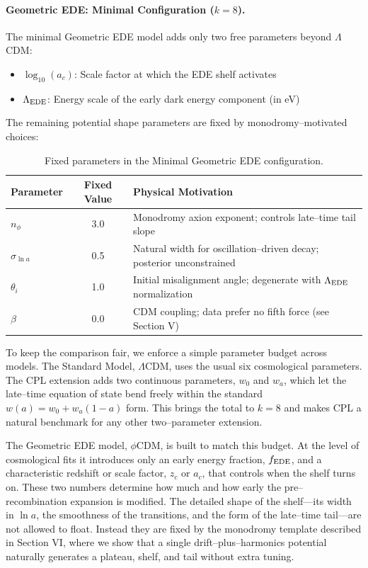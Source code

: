 \documentclass[a4paper,11pt]{article}
\begin{document}
\paragraph{Geometric EDE: Minimal Configuration ($k = 8$).}
The minimal Geometric EDE model adds only two free parameters beyond $\Lambda$CDM:
\begin{itemize}
    \item $\log_{10}(a_c)$: Scale factor at which the EDE shelf activates
    \item $\Lambda_{\rm EDE}$: Energy scale of the early dark energy component (in eV)
\end{itemize}

The remaining potential shape parameters are fixed by monodromy--motivated choices:

\begin{table}[h]
\centering
\caption{Fixed parameters in the Minimal Geometric EDE configuration.}
\label{tab:fixed_params}
\begin{tabular}{lcl}
\toprule
Parameter & Fixed Value & Physical Motivation \\
\midrule
$n_\phi$ & 3.0 & Monodromy axion exponent; controls late--time tail slope \\
$\sigma_{\ln a}$ & 0.5 & Natural width for oscillation--driven decay; posterior unconstrained \\
$\theta_i$ & 1.0 & Initial misalignment angle; degenerate with $\Lambda_{\rm EDE}$ normalization \\
$\beta$ & 0.0 & CDM coupling; data prefer no fifth force (see Section V) \\
\bottomrule
\end{tabular}
\end{table}

To keep the comparison fair, we enforce a simple parameter budget across models. The Standard Model, $\Lambda$CDM, uses the usual six cosmological parameters. The CPL extension adds two continuous parameters, $w_0$ and $w_a$, which let the late--time equation of state bend freely within the standard $w(a) = w_0 + w_a(1-a)$ form. This brings the total to $k = 8$ and makes CPL a natural benchmark for any other two--parameter extension.

The Geometric EDE model, $\phi$CDM, is built to match this budget. At the level of cosmological fits it introduces only an early energy fraction, $f_{\rm EDE}$, and a characteristic redshift or scale factor, $z_c$ or $a_c$, that controls when the shelf turns on. These two numbers determine how much and how early the pre--recombination expansion is modified. The detailed shape of the shelf---its width in $\ln a$, the smoothness of the transitions, and the form of the late--time tail---are not allowed to float. Instead they are fixed by the monodromy template described in Section VI, where we show that a single drift--plus--harmonics potential naturally generates a plateau, shelf, and tail without extra tuning.
\end{document}
